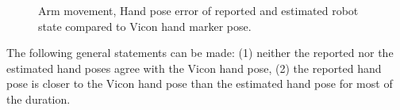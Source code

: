 \begin{figure}
\centering
{}


\caption{Arm movement, Hand pose error of reported and estimated robot state compared to Vicon hand marker pose.}
\label{fig:vic_error_arm_movement}
\end{figure}

The following general statements can be made: (1) neither the reported nor the estimated hand poses agree with the Vicon hand pose, (2) the reported hand pose is closer to the Vicon hand pose than the estimated hand pose for most of the duration.

